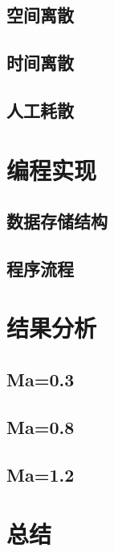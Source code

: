 \documentclass[UTF8]{ctexart}
\begin{document}
\subsection{空间离散}

\subsection{时间离散}

\subsection{人工耗散}

\section{编程实现}

\subsection{数据存储结构}

\subsection{程序流程}

\section{结果分析}

\subsection{Ma=0.3}



\subsection{Ma=0.8}

\subsection{Ma=1.2}

\section{总结}
\end{document}
